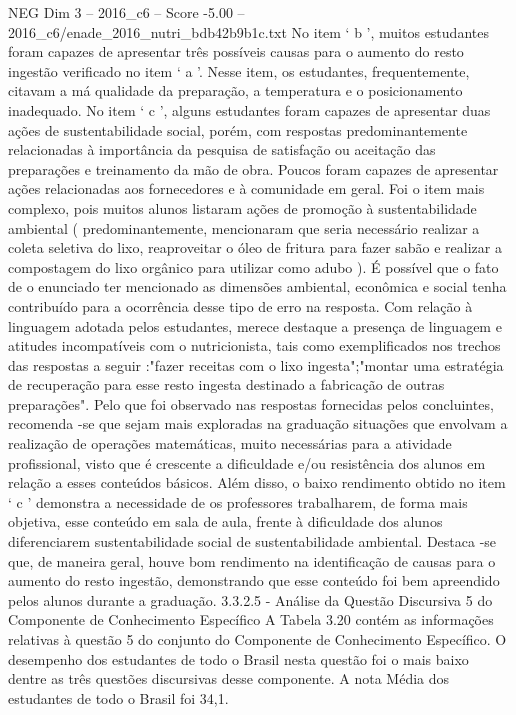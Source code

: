 \begin{textsample}{NEG Dim 3 – 2016\_c6 – Score -5.00 – 2016\_c6/enade\_2016\_nutri\_bdb42b9b1c.txt}
No item ‘ b ’, muitos estudantes foram capazes de apresentar três possíveis causas para o aumento do resto ingestão verificado no item ‘ a ’.
Nesse item, os estudantes, frequentemente, citavam a má qualidade da preparação, a temperatura e o posicionamento inadequado.
No item ‘ c ’, alguns estudantes foram capazes de apresentar duas ações de sustentabilidade social, porém, com respostas predominantemente relacionadas à importância da pesquisa de satisfação ou aceitação das preparações e treinamento da mão de obra.
Poucos foram capazes de apresentar ações relacionadas aos fornecedores e à comunidade em geral.
Foi o item mais complexo, pois muitos alunos listaram ações de promoção à sustentabilidade ambiental ( predominantemente, mencionaram que seria necessário realizar a coleta seletiva do lixo, reaproveitar o óleo de fritura para fazer sabão e realizar a compostagem do lixo orgânico para utilizar como adubo ).
É possível que o fato de o enunciado ter mencionado as dimensões ambiental, econômica e social tenha contribuído para a ocorrência desse tipo de erro na resposta.
Com relação à linguagem adotada pelos estudantes, merece destaque a presença de linguagem e atitudes incompatíveis com o nutricionista, tais como exemplificados nos trechos das respostas a seguir :"fazer receitas com o lixo ingesta";"montar uma estratégia de recuperação para esse resto ingesta destinado a fabricação de outras preparações".
Pelo que foi observado nas respostas fornecidas pelos concluintes, recomenda -se que sejam mais exploradas na graduação situações que envolvam a realização de operações matemáticas, muito necessárias para a atividade profissional, visto que é crescente a dificuldade e/ou resistência dos alunos em relação a esses conteúdos básicos.
Além disso, o baixo rendimento obtido no item ‘ c ’ demonstra a necessidade de os professores trabalharem, de forma mais objetiva, esse conteúdo em sala de aula, frente à dificuldade dos alunos diferenciarem sustentabilidade social de sustentabilidade ambiental.
Destaca -se que, de maneira geral, houve bom rendimento na identificação de causas para o aumento do resto ingestão, demonstrando que esse conteúdo foi bem apreendido pelos alunos durante a graduação. 3.3.2.5 - Análise da Questão Discursiva 5 do Componente de Conhecimento Específico A Tabela 3.20 contém as informações relativas à questão 5 do conjunto do Componente de Conhecimento Específico.
O desempenho dos estudantes de todo o Brasil nesta questão foi o mais baixo dentre as três questões discursivas desse componente.
A nota Média dos estudantes de todo o Brasil foi 34,1.

\end{textsample}
